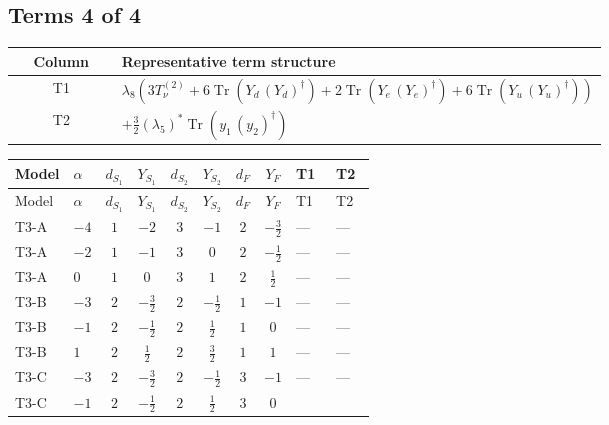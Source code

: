 \documentclass[8pt]{article}
\begin{document}
\begin{landscape}
\subsection*{Terms 4 of 4}
\begin{center}
\begin{tabular}{@{}c >{\raggedright\arraybackslash}p{0.82\linewidth}@{}}
\toprule
Column & Representative term structure \\
\midrule
T1 & \(\displaystyle {\lambda_{8}} (3 T_{\nu}^{(2)}+6 \operatorname{Tr}\!\left({Y_d}\,\left({Y_d}\right)^{\dagger}\right)+2 \operatorname{Tr}\!\left({Y_e}\,\left({Y_e}\right)^{\dagger}\right)+6 \operatorname{Tr}\!\left({Y_u}\,\left({Y_u}\right)^{\dagger}\right))\) \\
\midrule
T2 & \(\displaystyle +\frac{3}{2} \left({\lambda_5}\right)^{*} \operatorname{Tr}\!\left({y_1}\,\left({y_2}\right)^{\dagger}\right)\) \\
\midrule
\bottomrule
\end{tabular}
\end{center}
\smallskip
\tiny
\begin{longtable}{@{}llcccccc >{\raggedright\arraybackslash}p{0.21\linewidth} >{\raggedright\arraybackslash}p{0.21\linewidth}@{}}
\toprule
Model & $\alpha$ & $d_{S_1}$ & $Y_{S_1}$ & $d_{S_2}$ & $Y_{S_2}$ & $d_F$ & $Y_F$ & T1 & T2 \\
\midrule
\endfirsthead
\toprule
Model & $\alpha$ & $d_{S_1}$ & $Y_{S_1}$ & $d_{S_2}$ & $Y_{S_2}$ & $d_F$ & $Y_F$ & T1 & T2 \\
\midrule
\endhead
T3-A & $-4$ & $1$ & $-2$ & $3$ & $-1$ & $2$ & $-\frac{3}{2}$ & --- & --- \\
\midrule
T3-A & $-2$ & $1$ & $-1$ & $3$ & $0$ & $2$ & $-\frac{1}{2}$ & --- & --- \\
\midrule
T3-A & $0$ & $1$ & $0$ & $3$ & $1$ & $2$ & $\frac{1}{2}$ & --- & --- \\
\midrule
T3-B & $-3$ & $2$ & $-\frac{3}{2}$ & $2$ & $-\frac{1}{2}$ & $1$ & $-1$ & --- & --- \\
\midrule
T3-B & $-1$ & $2$ & $-\frac{1}{2}$ & $2$ & $\frac{1}{2}$ & $1$ & $0$ & --- & --- \\
\midrule
T3-B & $1$ & $2$ & $\frac{1}{2}$ & $2$ & $\frac{3}{2}$ & $1$ & $1$ & --- & --- \\
\midrule
T3-C & $-3$ & $2$ & $-\frac{3}{2}$ & $2$ & $-\frac{1}{2}$ & $3$ & $-1$ & --- & --- \\
\midrule
T3-C & $-1$ & $2$ & $-\frac{1}{2}$ & $2$ & $\frac{1}{2}$ & $3$ & $0$ & \scriptsize\adjustbox{max width=\linewidth}{$\begin{gathered} {\lambda_{8}} (3 T_{\nu}^{(2)}+6 \operatorname{Tr}\!\left({Y_d}\,\left({Y_d}\right)^{\dagger}\right)+2 \operatorname{Tr}\!\left({Y_e}\,\left({Y_e}\right)^{\dagger}\right)+6 \operatorname{Tr}\!\left({Y_u}\,\left({Y_u}\right)^{\dagger}\right))\end{gathered}$} & \scriptsize\adjustbox{max width=\linewidth}{$\begin{gathered} +\frac{3}{2} \left({\lambda_5}\right)^{*} \operatorname{Tr}\!\left({y_1}\,\left({y_2}\right)^{\dagger}\right)\end{gathered}$} \\

\end{longtable}
\end{landscape}
\end{document}
